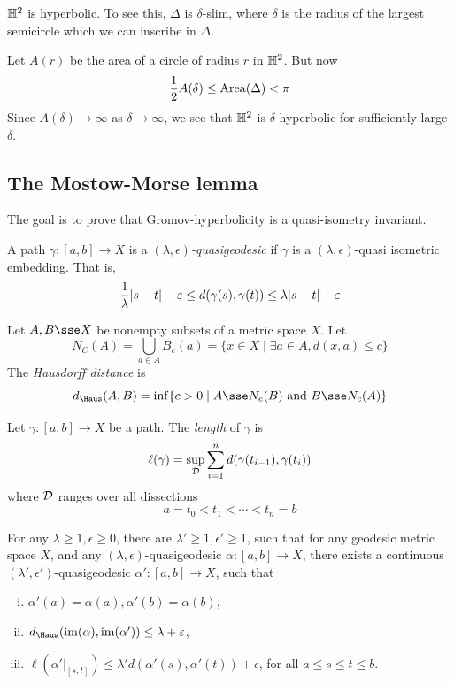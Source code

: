 \documentclass{article}
\begin{document}
\begin{example}
    \(\mathbb{H}^2\) is hyperbolic. To see this, \(\Delta\) is \(\delta\)-slim, where \(\delta\) is the radius of the largest semicircle which we can inscribe in \(\Delta\).

    Let \(A(r)\) be the area of a circle of radius \(r\) in \(\mathbb{H}^2\). But now
    \[\frac{1}{2}A(\delta) \le \operatorname{Area}(\Delta) < \pi\]
    Since \(A(\delta) \to \infty\) as \(\delta \to \infty\), we see that \(\mathbb{H}^2\) is \(\delta\)-hyperbolic for sufficiently large \(\delta\).
\end{example}

\subsection{The Mostow-Morse lemma}

The goal is to prove that Gromov-hyperbolicity is a quasi-isometry invariant.

\lec

\begin{definition}
    [quasigeodesic]
    A path \(\gamma : [a, b] \to X\) is a \emph{\((\lambda, \epsilon)\)-quasigeodesic} if \(\gamma\) is a \((\lambda, \epsilon)\)-quasi isometric embedding. That is,
    \[\frac{1}{\lambda}\abs{s - t} - \varepsilon \le d(\gamma(s), \gamma(t)) \le \lambda\abs{s - t} + \varepsilon\]
\end{definition}

\begin{definition}
     Let \(A, B \sse X\) be nonempty subsets of a metric space \(X\). Let
    \[N_C(A) = \bigcup_{a \in A}B_c(a) = \{x \in X \mid \exists a \in A, d(x, a) \le c\}\]
    The \emph{Hausdorff distance} is
    \[d_{\Haus}(A, B) = \inf\{c > 0 \mid A \sse N_c(B) \text{ and }B \sse N_c(A)\}\]
\end{definition}

\begin{definition}
    [length] Let \(\gamma : [a, b] \to X\) be a path. The \emph{length} of \(\gamma\) is
    \[\ell(\gamma) = \sup_{\mathcal{D}}\sum_{i=1}^n d(\gamma(t_{i-1}), \gamma(t_i))\]
    where \(\mathcal{D}\) ranges over all dissections
    \[a = t_0 < t_1 < \cdots < t_n = b\]
\end{definition}

\begin{lemma}
    \label{lem:quasi-geodesic-tame}
    For any \(\lambda \ge 1, \epsilon \ge 0\), there are \(\lambda' \ge 1, \epsilon' \ge 1\), such that for any geodesic metric space \(X\), and any \((\lambda, \epsilon)\)-quasigeodesic \(\alpha : [a, b] \to X\), there exists a continuous \((\lambda', \epsilon')\)-quasigeodesic \(\alpha' : [a, b] \to X\), such that
    \begin{enumerate}[(i)]
        \item \(\alpha'(a) = \alpha(a), \alpha'(b) = \alpha(b)\),
        \item \(d_\Haus(\im(\alpha), \im(\alpha')) \le \lambda + \epsilon\),
        \item \(\ell(\alpha'\vert_{[s, t]}) \le \lambda' d(\alpha'(s), \alpha'(t)) + \epsilon\), for all \(a \le s \le t \le b\).
    \end{enumerate}
\end{lemma}
\end{document}
